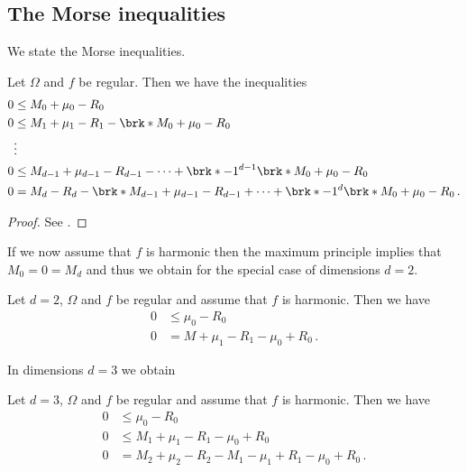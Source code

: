 \subsection{The Morse inequalities}

We state the Morse inequalities.
\begin{theorem}
Let $\Omega$ and $f$ be regular. Then we have the inequalities
\begin{align*}
  0&\leq M_0+\mu_0-R_0\\
  0&\leq M_1+\mu_1-R_1-\brk*{M_0+\mu_0-R_0} \\
  &\vdots \\
  0&\leq M_{d-1}+\mu_{d-1}-R_{d-1}-\cdots +\brk*{-1}^{d-1}\brk*{M_0+\mu_0-R_0} \\
  0&=M_{d}-R_{d}-\brk*{M_{d-1}+\mu_{d-1}-R_{d-1}}+\cdots +\brk*{-1}^{d}\brk*{M_0+\mu_0-R_0}\,.
\end{align*}
\end{theorem}
\begin{proof}
  See \cite{Morse1969}.
\end{proof}
If we now assume that $f$ is harmonic then the maximum principle implies that
$M_0=0=M_d$ and thus we obtain for the special case of dimensions $d=2$.
\begin{corollary}[Morse inequalities for $f$ harmonic, $d=2$]
  Let $d=2$, $\Omega$ and $f$ be regular and assume that $f$ is harmonic. Then we have
  \begin{align*}
    0&\leq \mu_0-R_0 \\
    0&=M+\mu_1-R_1-\mu_0+R_0\,.
  \end{align*}
\end{corollary}
In dimensions $d=3$ we obtain
\begin{corollary}[Morse inequalities for $f$ harmonic, $d=3$]
  Let $d=3$, $\Omega$ and $f$ be regular and assume that $f$ is harmonic. Then we have
  \begin{align*}
    0&\leq \mu_0-R_0 \\
    0&\leq M_1+\mu_1-R_1-\mu_0+R_0 \\
    0&= M_2+\mu_2-R_2-M_1-\mu_1+R_1-\mu_0+R_0\,.
  \end{align*}
\end{corollary}


\newpage

